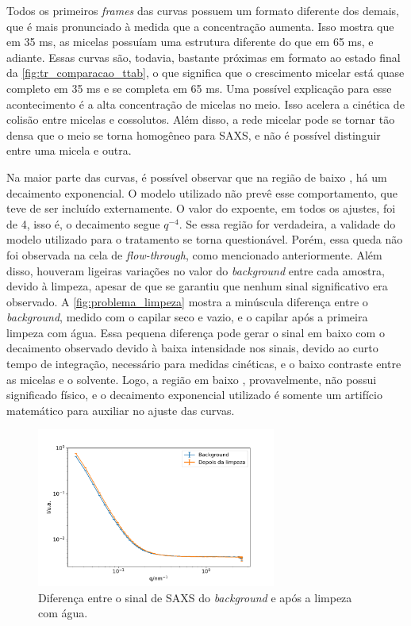 	
	Todos os primeiros \emph{frames} das curvas possuem um formato diferente dos demais, que é mais pronunciado à medida que a concentração aumenta. Isso mostra que em 35 ms, as micelas possuíam uma estrutura diferente do que em 65 ms, e adiante. Essas curvas são, todavia, bastante próximas em formato ao estado final da \autoref{fig:tr_comparacao_ttab}, o que significa que o crescimento micelar está quase completo em 35 ms e se completa em 65 ms. Uma possível explicação para esse acontecimento é a alta concentração de micelas no meio. Isso acelera a cinética de colisão entre micelas e cossolutos. Além disso, a rede micelar pode se tornar tão densa que o meio se torna homogêneo para SAXS, e não é possível distinguir entre uma micela e outra.
	
	Na maior parte das curvas, é possível observar que na região de baixo \q, há um decaimento exponencial. O modelo utilizado não prevê esse comportamento, que teve de ser incluído externamente. O valor do expoente, em todos os ajustes, foi de 4, isso é, o decaimento segue \( q^{-4} \). Se essa região for verdadeira, a validade do modelo utilizado para o tratamento se torna questionável. Porém, essa queda não foi observada na cela de \emph{flow-through}, como mencionado anteriormente. Além disso, houveram ligeiras variações no valor do \emph{background} entre cada amostra, devido à limpeza, apesar de que se garantiu que nenhum sinal significativo era observado. A \autoref{fig:problema_limpeza} mostra a minúscula diferença entre o \emph{background}, medido com o capilar seco e vazio, e o capilar após a primeira limpeza com água. Essa pequena diferença pode gerar o sinal em baixo \q{} com o decaimento observado devido à baixa intensidade nos sinais, devido ao curto tempo de integração, necessário para medidas cinéticas, e o baixo contraste entre as micelas e o solvente. Logo, a região em baixo \q{}, provavelmente, não possui significado físico, e o decaimento exponencial utilizado é somente um artifício matemático para auxiliar no ajuste das curvas.
	
	\begin{figure}[h]
		\centering
		\includegraphics[width=0.7\textwidth]{imagens/saxs/problema_limpeza}
		\caption{Diferença entre o sinal de SAXS do \emph{background} e após a limpeza com água.}
		\label{fig:problema_limpeza}
	\end{figure}

